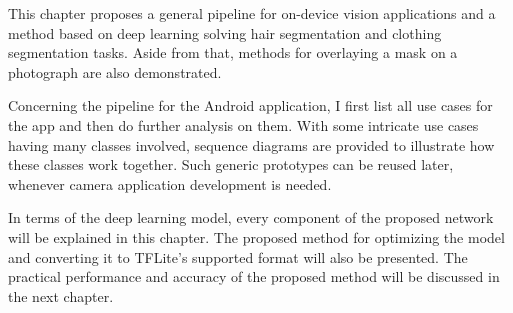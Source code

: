  \label{ch:chap3} \graphicspath{{./chapter3/image/}}

This chapter proposes a general pipeline for on-device vision applications and a method based on deep learning solving hair segmentation and clothing segmentation tasks. Aside from that, methods for overlaying a mask on a photograph are also demonstrated. \par
Concerning the pipeline for the Android application, I first list all use cases for the app and then do further analysis on them. With some intricate use cases having many classes involved, sequence diagrams are provided to illustrate how these classes work together. Such generic prototypes can be reused later, whenever camera application development is needed. \par
In terms of the deep learning model, every component of the proposed network will be explained in this chapter. The proposed method for optimizing the model and converting it to TFLite's supported format will also be presented. The practical performance and accuracy of the proposed method will be discussed in the next chapter.\par

